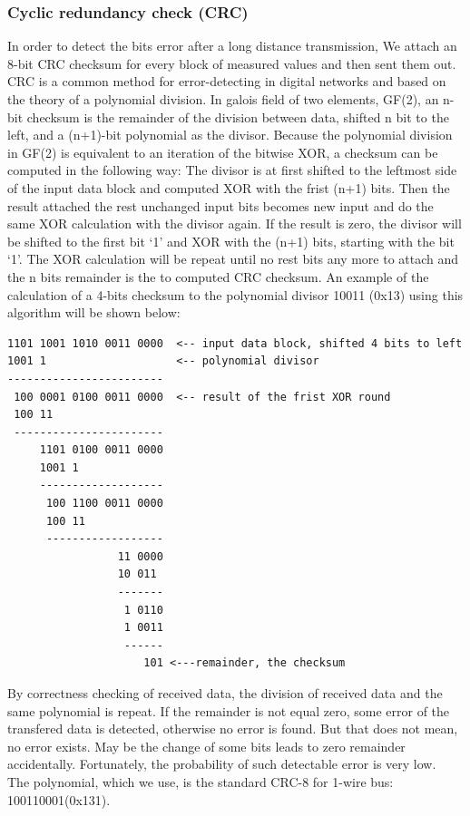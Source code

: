 \documentclass[a4paper]{scrreprt}
\begin{document}
\subsubsection{Cyclic redundancy check (CRC)}
In order to detect the bits error after a long distance transmission, 
We attach an 8-bit CRC checksum for every block of measured values and then sent them out. \\
CRC is a common method for error-detecting in digital networks and based on the theory of a polynomial division. 
In galois field of two elements, GF(2),
an n-bit checksum is the remainder of the division between data, shifted n bit to the left, and a (n+1)-bit polynomial as the divisor.
Because the polynomial division in GF(2) is equivalent to an iteration of the bitwise XOR, a checksum can be computed in the following way:
The divisor is at first shifted to the leftmost side of the input data block and computed XOR with the frist (n+1) bits.
Then the result attached the rest unchanged input bits becomes new input and do the same XOR calculation with the divisor again.
If the result is zero, the divisor will be shifted to the first bit `1' and XOR with the (n+1) bits, starting with the bit `1'. 
The XOR calculation will be repeat until no rest bits any more to attach and the n bits remainder is the to computed CRC checksum.
An example of the calculation of a 4-bits checksum to the polynomial divisor 10011 (0x13) using this algorithm will be shown below:

\lstset{style=mathstyle}
\begin{lstlisting}[xleftmargin=25pt, xrightmargin=25pt,framexleftmargin=10pt,framextopmargin=10pt, framexbottommargin=10pt]
1101 1001 1010 0011 0000  <-- input data block, shifted 4 bits to left 
1001 1                    <-- polynomial divisor
------------------------
 100 0001 0100 0011 0000  <-- result of the frist XOR round
 100 11
 -----------------------
     1101 0100 0011 0000
     1001 1
     -------------------
      100 1100 0011 0000
      100 11
      ------------------
                 11 0000
                 10 011
                 -------
                  1 0110
                  1 0011
                  ------
                     101 <---remainder, the checksum
\end{lstlisting}
By correctness checking of received data, the division of received data and the same polynomial is repeat.
If the remainder is not equal zero, some error of the transfered data is detected, otherwise no error is found.
But that does not mean, no error exists.
May be the change of some bits leads to zero remainder accidentally. Fortunately, the probability of such detectable error is very low.\\
The polynomial, which we use, is the standard CRC-8 for 1-wire bus: 100110001(0x131).
\end{document}
